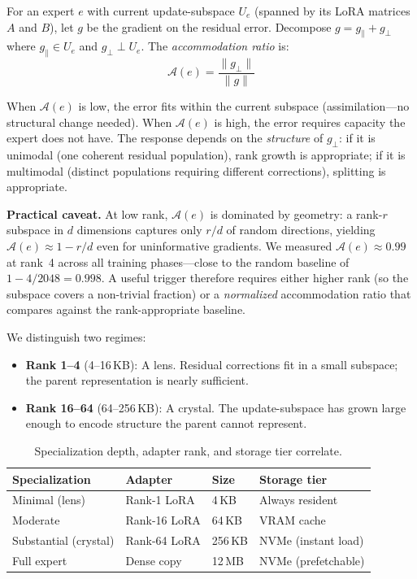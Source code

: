 \documentclass{article}
\begin{document}
For an expert $e$ with current update-subspace $U_e$ (spanned by its LoRA
matrices $A$ and $B$), let $g$ be the gradient on the residual error. Decompose
$g = g_\parallel + g_\perp$ where $g_\parallel \in U_e$ and $g_\perp \perp U_e$.
The \emph{accommodation ratio} is:
\begin{equation}
\mathcal{A}(e) = \frac{\|g_\perp\|}{\|g\|}
\label{eq:accommodation}
\end{equation}

When $\mathcal{A}(e)$ is low, the error fits within the current subspace
(assimilation---no structural change needed). When $\mathcal{A}(e)$ is high,
the error requires capacity the expert does not have. The response depends on
the \emph{structure} of $g_\perp$: if it is unimodal (one coherent residual
population), rank growth is appropriate; if it is multimodal (distinct
populations requiring different corrections), splitting is appropriate.

\textbf{Practical caveat.} At low rank, $\mathcal{A}(e)$ is dominated by
geometry: a rank-$r$ subspace in $d$ dimensions captures only $r/d$ of random
directions, yielding $\mathcal{A}(e) \approx 1 - r/d$ even for uninformative
gradients. We measured $\mathcal{A}(e) \approx 0.99$ at rank~4 across all
training phases---close to the random baseline of $1 - 4/2048 = 0.998$. A
useful trigger therefore requires either higher rank (so the subspace covers a
non-trivial fraction) or a \emph{normalized} accommodation ratio that
compares against the rank-appropriate baseline.

We distinguish two regimes:
\begin{itemize}
    \item \textbf{Rank 1--4} (4--16\,KB): A lens. Residual corrections fit
          in a small subspace; the parent representation is nearly sufficient.
    \item \textbf{Rank 16--64} (64--256\,KB): A crystal. The update-subspace
          has grown large enough to encode structure the parent cannot represent.
\end{itemize}

\begin{table}[t]
\centering
\caption{Specialization depth, adapter rank, and storage tier correlate.}
\label{tab:unification}
\begin{tabular}{@{}llll@{}}
\toprule
Specialization & Adapter & Size & Storage tier \\
\midrule
Minimal (lens) & Rank-1 LoRA & 4\,KB & Always resident \\
Moderate       & Rank-16 LoRA & 64\,KB & VRAM cache \\
Substantial (crystal) & Rank-64 LoRA & 256\,KB & NVMe (instant load) \\
Full expert    & Dense copy & 12\,MB & NVMe (prefetchable) \\
\bottomrule
\end{tabular}
\end{table}
\end{document}
